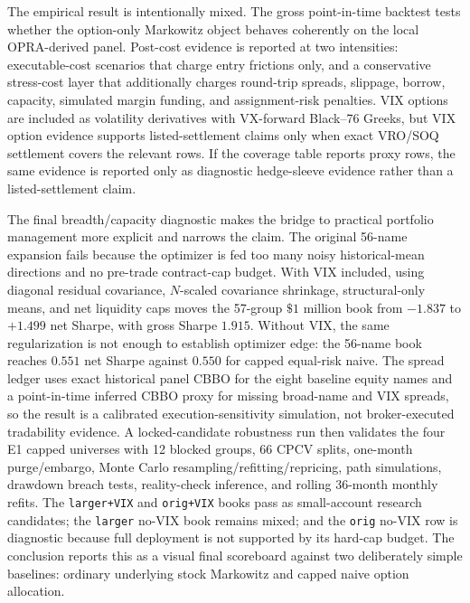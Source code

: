 The empirical result is intentionally mixed. The gross point-in-time backtest tests whether
the option-only Markowitz object behaves coherently on the local OPRA-derived panel.
Post-cost evidence is reported at two intensities: executable-cost scenarios that charge
entry frictions only, and a conservative stress-cost layer that additionally charges
round-trip spreads, slippage, borrow, capacity, simulated margin funding, and
assignment-risk penalties. VIX options are included as volatility derivatives with
VX-forward Black--76 Greeks, but VIX option evidence supports listed-settlement claims
only when exact VRO/SOQ settlement covers the relevant rows. If the coverage table reports
proxy rows, the same evidence is reported only as diagnostic hedge-sleeve evidence rather
than a listed-settlement claim.

The final breadth/capacity diagnostic makes the bridge to practical portfolio management
more explicit and narrows the claim. The original 56-name expansion fails because the
optimizer is fed too many noisy historical-mean directions and no pre-trade contract-cap
budget. With VIX included, using diagonal residual covariance, \(N\)-scaled covariance
shrinkage, structural-only means, and net liquidity caps moves the 57-group \(\$1\)
million book from \(-1.837\) to \(+1.499\) net Sharpe, with gross Sharpe \(1.915\).
Without VIX, the same regularization is not enough to establish optimizer edge: the
56-name book reaches \(0.551\) net Sharpe against \(0.550\) for capped equal-risk naive.
The spread ledger uses exact historical panel CBBO for the eight baseline equity names
and a point-in-time inferred CBBO proxy for missing broad-name and VIX spreads, so the
result is a calibrated execution-sensitivity simulation, not broker-executed tradability
evidence. A locked-candidate robustness run then validates the four E1 capped universes
with 12 blocked groups, 66 CPCV splits, one-month purge/embargo, Monte Carlo
resampling/refitting/repricing, path simulations, drawdown breach tests, reality-check
inference, and rolling 36-month monthly refits. The \texttt{larger+VIX} and
\texttt{orig+VIX} books pass as small-account research candidates; the \texttt{larger}
no-VIX book remains mixed; and the \texttt{orig} no-VIX row is diagnostic because full
deployment is not supported by its hard-cap budget. The conclusion reports this as a
visual final scoreboard against two deliberately simple baselines: ordinary underlying
stock Markowitz and capped naive option allocation.

